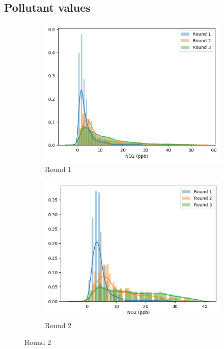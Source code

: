 \documentclass{article}
\begin{document}
\subsection{Pollutant values}
\begin{figure}
\centering
\begin{subfigure}{0.32\textwidth}
\includegraphics[width=\textwidth]{results/distributions/location_donovan_no2.png}
\caption{Round 1}
\end{subfigure}
\begin{subfigure}{0.32\textwidth}
\includegraphics[width=\textwidth]{results/distributions/location_elcajon_no2.png}
\caption{Round 2}

\end{subfigure}
\end{figure}
\end{document}
